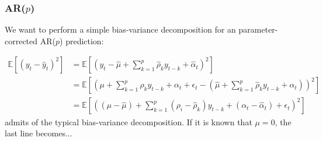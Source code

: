 \documentclass[9pt]{beamer}
\def\E{\mathbb{E}} %
\theoremstyle{definition}
\begin{document}
    





\begin{frame}\frametitle{AR($p$)}

    We want to perform a simple bias-variance decomposition for an parameter-corrected AR($p$) prediction:

    \begin{align}
        \E[(y_{t}-\hat{y}_{t})^{2}] &= \E[(y_{t} - \hat\mu + \sum^{p}_{k=1}\hat\rho_{k}y_{t-k} + \hat{\alpha}_{t})^{2}]\\
        &= \E[(\mu + \sum^{p}_{k=1}\rho_{k}y_{t-k} + \alpha_{t} + \epsilon_{t}  - (\hat\mu + \sum^{p}_{k=1}\hat\rho_{k}y_{t-k} + \hat{\alpha}_{t}))^{2}] \\
        &= \E[((\mu - \hat\mu) + \sum^{p}_{k=1}(\rho_{i}-\hat\rho_{k})y_{t-k} + (\alpha_{t} - \hat{\alpha}_{t}) + \epsilon_{t} )^{2}]
        \end{align}
      admits of the typical bias-variance decomposition.  If it is known that $\mu = 0$, the last line becomes...

\end{frame}
\end{document}
